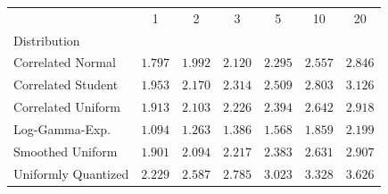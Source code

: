 \begin{tabular}{lcccccc}
\toprule
 & 1 & 2 & 3 & 5 & 10 & 20 \\
Distribution &  &  &  &  &  &  \\
\midrule
Correlated Normal & $ 1.797 $ & $ 1.992 $ & $ 2.120 $ & $ 2.295 $ & $ 2.557 $ & $ 2.846 $ \\
Correlated Student & $ 1.953 $ & $ 2.170 $ & $ 2.314 $ & $ 2.509 $ & $ 2.803 $ & $ 3.126 $ \\
Correlated Uniform & $ 1.913 $ & $ 2.103 $ & $ 2.226 $ & $ 2.394 $ & $ 2.642 $ & $ 2.918 $ \\
Log-Gamma-Exp. & $ 1.094 $ & $ 1.263 $ & $ 1.386 $ & $ 1.568 $ & $ 1.859 $ & $ 2.199 $ \\
Smoothed Uniform & $ 1.901 $ & $ 2.094 $ & $ 2.217 $ & $ 2.383 $ & $ 2.631 $ & $ 2.907 $ \\
Uniformly Quantized & $ 2.229 $ & $ 2.587 $ & $ 2.785 $ & $ 3.023 $ & $ 3.328 $ & $ 3.626 $ \\
\bottomrule
\end{tabular}
